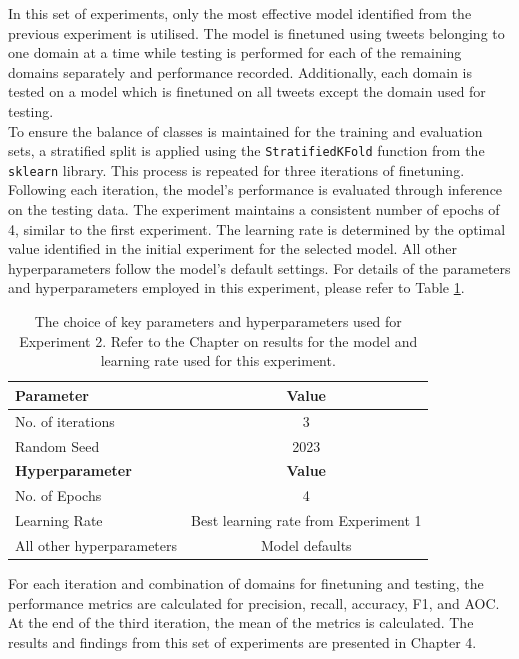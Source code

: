 In this set of experiments, only the most effective model identified from the previous experiment is utilised. The model is finetuned using tweets belonging to one domain at a time while testing is performed for each of the remaining domains separately and performance recorded. Additionally, each domain is tested on a  model which is finetuned on all tweets except the domain used for testing.\\

To ensure the balance of classes is maintained for the training and evaluation sets, a stratified split is applied using the \texttt{StratifiedKFold} function from the \texttt{sklearn} library. This process is repeated for three iterations of finetuning. Following each iteration, the model's performance is evaluated through inference on the testing data. The experiment maintains a consistent number of epochs of 4, similar to the first experiment. The learning rate is determined by the optimal value identified in the initial experiment for the selected model. All other hyperparameters follow the model's default settings. For details of the parameters and hyperparameters employed in this experiment, please refer to Table \ref{tab: exp2_params}.

\begin{table}[ht]
    \captionsetup{font=small}
    \centering
    \begin{tabularx}{\textwidth}{|X|c|}
        \hline
        \rowcolor[gray]{0.7}
        \textbf{Parameter}        & \textbf{Value}                       \\
        \hline
        No. of iterations         & 3                                    \\
        \hline
        Random Seed               & 2023                                 \\
        \hline
        \hline
        \rowcolor[gray]{0.7}
        \textbf{Hyperparameter}   & \textbf{Value}                       \\
        \hline
        No. of Epochs             & 4                                    \\
        \hline
        Learning Rate             & Best learning rate from Experiment 1 \\
        \hline
        All other hyperparameters & Model defaults                       \\
        \hline
    \end{tabularx}
    \caption{The choice of key parameters and hyperparameters used for Experiment 2. Refer to the Chapter on results for the model and learning rate used for this experiment. }
    \label{tab: exp2_params}
\end{table}
For each iteration and combination of domains for finetuning and testing, the performance metrics are calculated for precision, recall, accuracy, F1, and AOC. At the end of the third iteration, the mean of the metrics is calculated. The results and findings from this set of experiments are presented in Chapter 4.

